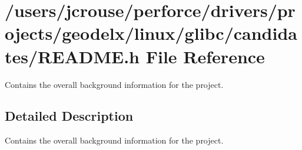 \section{/users/jcrouse/perforce/drivers/projects/geodelx/linux/glibc/candidates/README.h File Reference}
\label{README_8h}
Contains the overall background information for the project. 




\subsection{Detailed Description}
Contains the overall background information for the project.



